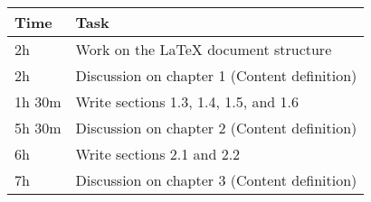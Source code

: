\begin{center}
    {\renewcommand{\arraystretch}{2}%
    \begin{tabular}{L{2cm}L{12cm}}
        \hline
        \textbf{Time} & \textbf{Task} \\
        \hline
        2h & Work on the LaTeX document structure \\
        \hline
        2h & Discussion on chapter 1 (Content definition) \\
        \hline
        1h 30m& Write sections 1.3, 1.4, 1.5, and 1.6 \\
        \hline
        5h 30m & Discussion on chapter 2 (Content definition) \\
        \hline
        6h & Write sections 2.1 and 2.2 \\
        \hline
        7h & Discussion on chapter 3 (Content definition) \\
        \hline
    \end{tabular}}
\end{center}